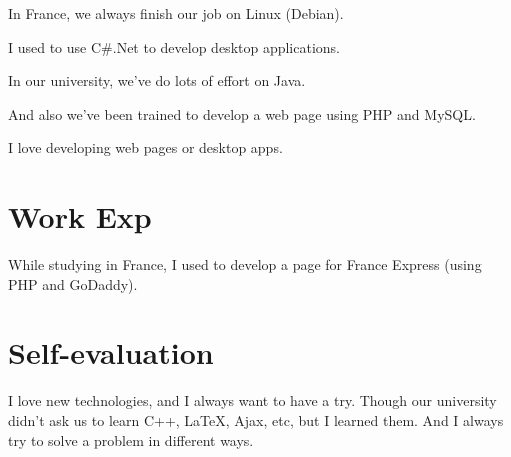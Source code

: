 \documentclass[UTF8]{ctexart}
\begin{document}
In France, we always finish our job on Linux (Debian).

I used to use C\#{}.Net to develop desktop applications.

In our university, we've do lots of effort on Java.

And also we've been trained to develop a web page using PHP and MySQL.

I love developing web pages or desktop apps.
\section{Work Exp}
While studying in France, I used to develop a page for France Express (using PHP and GoDaddy).
\section{Self-evaluation}
I love new technologies, and I always want to have a try. Though our university didn't ask us to learn C++, \LaTeX{}, Ajax, etc, but I learned them. And I always try to solve a problem in different ways.
\end{document}
